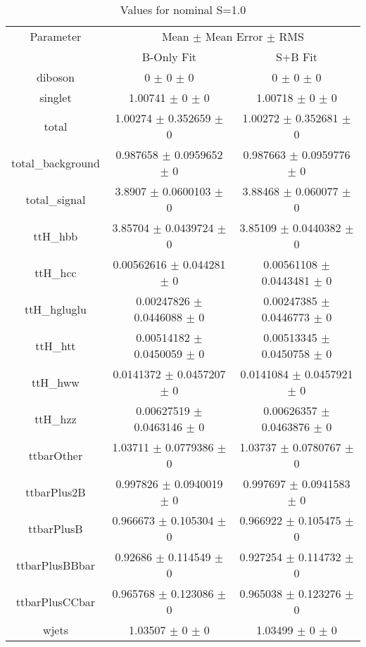 \begin{table}
\centering
\caption{Values for nominal S=1.0}
\begin{tabular}{ccc}
\toprule
Parameter & \multicolumn{2}{c}{Mean $\pm$ Mean Error $\pm$ RMS}\\
 & B-Only Fit & S+B Fit\\
\midrule
diboson & \num{0} $\pm$ \num{0} $\pm$ \num{0} & \num{0} $\pm$ \num{0} $\pm$ \num{0}\\
singlet & \num{1.00741} $\pm$ \num{0} $\pm$ \num{0} & \num{1.00718} $\pm$ \num{0} $\pm$ \num{0}\\
total & \num{1.00274} $\pm$ \num{0.352659} $\pm$ \num{0} & \num{1.00272} $\pm$ \num{0.352681} $\pm$ \num{0}\\
total\_background & \num{0.987658} $\pm$ \num{0.0959652} $\pm$ \num{0} & \num{0.987663} $\pm$ \num{0.0959776} $\pm$ \num{0}\\
total\_signal & \num{3.8907} $\pm$ \num{0.0600103} $\pm$ \num{0} & \num{3.88468} $\pm$ \num{0.060077} $\pm$ \num{0}\\
ttH\_hbb & \num{3.85704} $\pm$ \num{0.0439724} $\pm$ \num{0} & \num{3.85109} $\pm$ \num{0.0440382} $\pm$ \num{0}\\
ttH\_hcc & \num{0.00562616} $\pm$ \num{0.044281} $\pm$ \num{0} & \num{0.00561108} $\pm$ \num{0.0443481} $\pm$ \num{0}\\
ttH\_hgluglu & \num{0.00247826} $\pm$ \num{0.0446088} $\pm$ \num{0} & \num{0.00247385} $\pm$ \num{0.0446773} $\pm$ \num{0}\\
ttH\_htt & \num{0.00514182} $\pm$ \num{0.0450059} $\pm$ \num{0} & \num{0.00513345} $\pm$ \num{0.0450758} $\pm$ \num{0}\\
ttH\_hww & \num{0.0141372} $\pm$ \num{0.0457207} $\pm$ \num{0} & \num{0.0141084} $\pm$ \num{0.0457921} $\pm$ \num{0}\\
ttH\_hzz & \num{0.00627519} $\pm$ \num{0.0463146} $\pm$ \num{0} & \num{0.00626357} $\pm$ \num{0.0463876} $\pm$ \num{0}\\
ttbarOther & \num{1.03711} $\pm$ \num{0.0779386} $\pm$ \num{0} & \num{1.03737} $\pm$ \num{0.0780767} $\pm$ \num{0}\\
ttbarPlus2B & \num{0.997826} $\pm$ \num{0.0940019} $\pm$ \num{0} & \num{0.997697} $\pm$ \num{0.0941583} $\pm$ \num{0}\\
ttbarPlusB & \num{0.966673} $\pm$ \num{0.105304} $\pm$ \num{0} & \num{0.966922} $\pm$ \num{0.105475} $\pm$ \num{0}\\
ttbarPlusBBbar & \num{0.92686} $\pm$ \num{0.114549} $\pm$ \num{0} & \num{0.927254} $\pm$ \num{0.114732} $\pm$ \num{0}\\
ttbarPlusCCbar & \num{0.965768} $\pm$ \num{0.123086} $\pm$ \num{0} & \num{0.965038} $\pm$ \num{0.123276} $\pm$ \num{0}\\
wjets & \num{1.03507} $\pm$ \num{0} $\pm$ \num{0} & \num{1.03499} $\pm$ \num{0} $\pm$ \num{0}\\
\bottomrule
\end{tabular}
\end{table}
